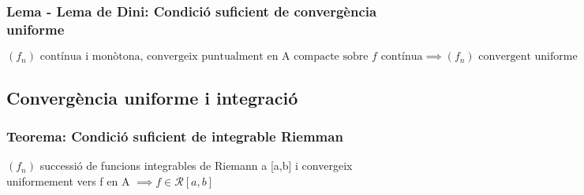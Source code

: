 \documentclass[11pt]{article}
\begin{document}
\subsubsection{Lema - Lema de Dini: Condició suficient de convergència uniforme}
\label{sec:orgeed0e2d}
\((f_{n}) \text{ contínua i monòtona, convergeix puntualment en A compacte sobre } f \text{ contínua} \implies (f_{n}) \text{ convergent uniforme}\)
\subsection{Convergència uniforme i integració}
\label{sec:org99d130f}
\subsubsection{Teorema: Condició suficient de integrable Riemman}
\label{sec:org64c5f22}
\((f_{n})\) successió de funcions integrables de Riemann a [a,b] i convergeix uniformement vers f en A \(\implies f \in \mathcal{R}[a,b]\)
\end{document}
